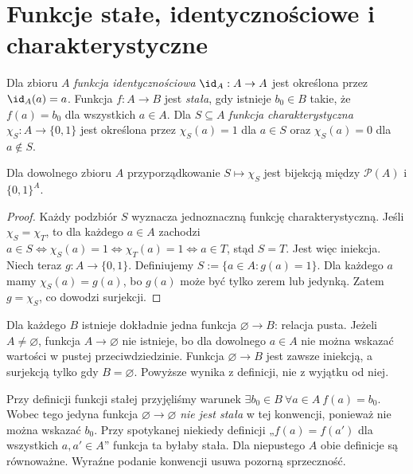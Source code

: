 \section{Funkcje stałe, identycznościowe i charakterystyczne}
\begin{definicja}
Dla zbioru $A$ \emph{funkcja identycznościowa} $\id_A:A\to A$ jest określona przez $\id_A(a)=a$. Funkcja $f:A\to B$ jest \emph{stała}, gdy istnieje $b_0\in B$ takie, że $f(a)=b_0$ dla wszystkich $a\in A$. Dla $S\subseteq A$ \emph{funkcja charakterystyczna} $\chi_S:A\to\{0,1\}$ jest określona przez $\chi_S(a)=1$ dla $a\in S$ oraz $\chi_S(a)=0$ dla $a\notin S$.
\end{definicja}
\begin{twierdzenie}\label{thm:characteristic-bijection}
Dla dowolnego zbioru $A$ przyporządkowanie $S\mapsto\chi_S$ jest bijekcją między $\mathcal P(A)$ i $\{0,1\}^A$.
\end{twierdzenie}
\begin{proof}
Każdy podzbiór $S$ wyznacza jednoznaczną funkcję charakterystyczną. Jeśli $\chi_S=\chi_T$, to dla każdego $a\in A$ zachodzi $a\in S\Leftrightarrow\chi_S(a)=1\Leftrightarrow\chi_T(a)=1\Leftrightarrow a\in T$, stąd $S=T$. Jest więc iniekcja. Niech teraz $g:A\to\{0,1\}$. Definiujemy $S:=\{a\in A:g(a)=1\}$. Dla każdego $a$ mamy $\chi_S(a)=g(a)$, bo $g(a)$ może być tylko zerem lub jedynką. Zatem $g=\chi_S$, co dowodzi surjekcji.
\end{proof}
\begin{uwaga}
Dla każdego $B$ istnieje dokładnie jedna funkcja $\varnothing\to B$: relacja pusta. Jeżeli $A\ne\varnothing$, funkcja $A\to\varnothing$ nie istnieje, bo dla dowolnego $a\in A$ nie można wskazać wartości w pustej przeciwdziedzinie. Funkcja $\varnothing\to B$ jest zawsze iniekcją, a surjekcją tylko gdy $B=\varnothing$. Powyższe wynika z definicji, nie z wyjątku od niej.
\end{uwaga}

\begin{uwaga}
Przy definicji funkcji stałej przyjęliśmy warunek
$\exists b_0\in B\ \forall a\in A\ f(a)=b_0$. Wobec tego
jedyna funkcja $\varnothing\to\varnothing$ \emph{nie jest stała}
w tej konwencji, ponieważ nie można wskazać $b_0$.
Przy spotykanej niekiedy definicji „$f(a)=f(a')$ dla wszystkich
$a,a'\in A$” funkcja ta byłaby stała. Dla niepustego $A$
obie definicje są równoważne. Wyraźne podanie konwencji usuwa
pozorną sprzeczność.
\end{uwaga}

